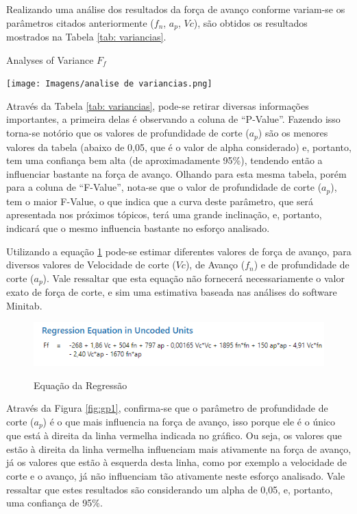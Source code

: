 \documentclass[deposito, acronym, symbols]{fei}
\begin{document}
Realizando uma análise dos resultados da força de avanço conforme variam-se os parâmetros citados anteriormente ($f_n$, $a_p$, $Vc$), são obtidos os resultados mostrados na Tabela \ref{tab: variancias}. 

\begin{table}[!htb]
 \centering
    \caption{Analyses of Variance $F_f$}
    \texttt{[image: Imagens/analise de variancias.png]}
    \label{tab: variancias}
 \end{table}

Através da Tabela \ref{tab: variancias}, pode-se retirar diversas informações importantes, a primeira delas é observando a coluna de “P-Value”. Fazendo isso torna-se notório que os valores de profundidade de corte ($a_p$) são os menores valores da tabela (abaixo de 0,05, que é o valor de alpha considerado) e, portanto, tem uma confiança bem alta (de aproximadamente 95\%), tendendo então a influenciar bastante na força de avanço. 
Olhando para esta mesma tabela, porém para a coluna de “F-Value”, nota-se que o valor de profundidade de corte ($a_p$), tem o maior F-Value, o que indica que a curva deste parâmetro, que será apresentada nos próximos tópicos, terá uma grande inclinação, e, portanto, indicará que o mesmo influencia bastante no esforço analisado.

Utilizando a equação \ref{fig:eq1} pode-se estimar diferentes valores de força de avanço, para diversos valores de Velocidade de corte ($Vc$), de Avanço ($f_n$) e de profundidade de corte ($a_p$). Vale ressaltar que esta equação não fornecerá necessariamente o valor exato de força de corte, e sim uma estimativa baseada nas análises do software Minitab. 

\begin{figure}[!htp]
    \centering
    \caption{Equação da Regressão}
    \includegraphics[width=0.7\linewidth]{Imagens/equação de regressão.png}
    \label{fig:eq1}
\end{figure}

Através da Figura \ref{fig:gp1}, confirma-se que o parâmetro de profundidade de corte ($a_p$) é o que mais influencia na força de avanço, isso porque ele é o único que está à direita da linha vermelha indicada no gráfico. Ou seja, os valores que estão à direita da linha vermelha influenciam mais ativamente na força de avanço, já os valores que estão à esquerda desta linha, como por exemplo a velocidade de corte e o avanço, já não influenciam tão ativamente neste esforço analisado. 
Vale ressaltar que estes resultados são considerando um alpha de 0,05, e, portanto, uma confiança de 95\%.
\end{document}

